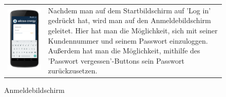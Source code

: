 \begin{figure}[h]
\begin{tabularx}{\textwidth}{X  X}
	\includegraphics[scale = 0.155]{img/AndroidMockup/login} \caption {Anmeldebildschirm} &	Nachdem man auf dem Startbildschirm auf 'Log in' gedrückt hat, wird man auf den Anmeldebildschirm geleitet. Hier hat man die Möglichkeit, sich mit seiner Kundennummer und seinem Passwort einzuloggen. Außerdem hat man die Möglichkeit, mithilfe des 'Passwort vergessen'-Buttons sein Passwort zurückzusetzen. \\ 
\end{tabularx}
\end{figure}


